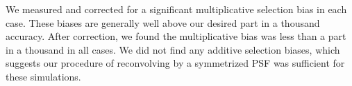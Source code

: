 \documentclass[iop]{emulateapj}
\newcommand{\snr}{$S/N$}
\newcommand{\Mcal}{\textsc{Metacalibration}}
\newcommand{\bdksim}{\texttt{BDK}}
\begin{document}
We measured and corrected for a significant multiplicative selection bias in
each case.  These biases are generally well above our desired part in a
thousand accuracy.  After correction, we found the  multiplicative bias was
less than a part in a thousand in all cases.  We did not find any additive
selection biases, which suggests our procedure of reconvolving by a symmetrized
PSF was sufficient for these simulations.

\end{document}
